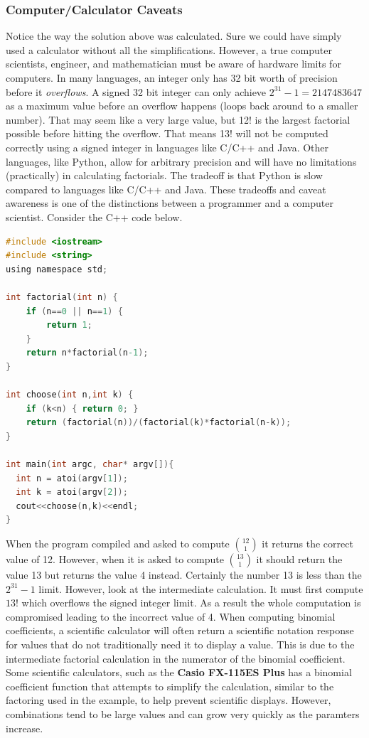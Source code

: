 \subsubsection*{Computer/Calculator Caveats} 
Notice the way the solution above was calculated.  Sure we could have simply used a calculator without all the simplifications.  However, a true computer scientists, engineer, and mathematician must be aware of hardware limits for computers.  In many languages, an integer only has 32 bit worth of precision before it \emph{overflows}. A signed 32 bit integer can only achieve $2^{31}-1 = 2147483647$ as a maximum value before an overflow happens (loops back around to a smaller number). That may seem like a very large value, but 12! is the largest factorial possible before hitting the overflow.  That means 13! will not be computed correctly using a signed integer in languages like C/C++ and Java.  Other languages, like Python, allow for arbitrary precision and will have no limitations (practically) in calculating factorials.  The tradeoff is that Python is slow compared to languages like C/C++ and Java.  These tradeoffs and caveat awareness is one of the distinctions between a programmer and a computer scientist. 
Consider the C++ code below.
\begin{lstlisting}[language=C]
#include <iostream>
#include <string>
using namespace std;

int factorial(int n) {
    if (n==0 || n==1) {
        return 1;
    }
    return n*factorial(n-1);
}

int choose(int n,int k) {
    if (k<n) { return 0; }
    return (factorial(n))/(factorial(k)*factorial(n-k));
}

int main(int argc, char* argv[]){
  int n = atoi(argv[1]);
  int k = atoi(argv[2]);
  cout<<choose(n,k)<<endl;
}
\end{lstlisting}
When the program compiled and asked to compute $\binom{12}{1}$ it returns the correct value of 12.  However, when it is asked to compute $\binom{13}{1}$ it should return the value 13 but returns the value 4 instead.   Certainly the number 13 is less than the $2^{31}-1$ limit.  However, look at the intermediate calculation.  It must first compute $13!$ which overflows the signed integer limit.  As a result the whole computation is compromised leading to the incorrect value of 4.  When computing binomial coefficients, a scientific calculator will often return a scientific notation response for values that do not traditionally need it to display a value.  This is due to the intermediate factorial calculation in the numerator of the binomial coefficient. Some scientific calculators, such as the \textbf{Casio FX-115ES Plus} has a binomial coefficient function that attempts to simplify the calculation, similar to the factoring used in the example, to help prevent scientific displays.  However, combinations tend to be large values and can grow very quickly as the paramters increase.


